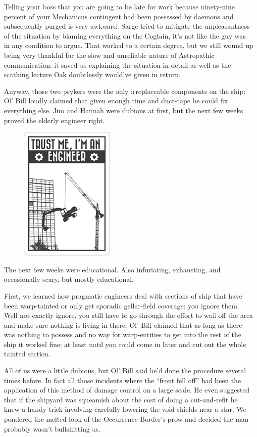 Telling your boss that you are going to be late for work because ninety-nine percent of your Mechanicus contingent had been possessed by daemons and subsequently purged is very awkward. 
Sarge tried to mitigate the unpleasantness of the situation by blaming everything on the Cogtain, it’s not like the guy was in any condition to argue. 
That worked to a certain degree, but we still wound up being very thankful for the slow and unreliable nature of Astropathic communication: 
it saved us explaining the situation in detail as well as the scathing lecture Oak doubtlessly would’ve given in return.

Anyway, those two psykers were the only irreplaceable components on the ship: 
Ol’ Bill loudly claimed that given enough time and duct-tape he could fix everything else. 
Jim and Hannah were dubious at first, but the next few weeks proved the elderly engineer right.

\begin{figure}
	\begin{center}
		\includegraphics[width=\figwidth]{pics/7/51.png}
	\end{center}
\end{figure}
The next few weeks were educational. 
Also infuriating, exhausting, and occasionally scary, but mostly educational.

First, we learned how pragmatic engineers deal with sections of ship that have been warp-tainted or only get sporadic gellar-field coverage: 
you ignore them. 
Well not exactly ignore, you still have to go through the effort to wall off the area and make sure nothing is living in there. 
Ol’ Bill claimed that as long as there was nothing to possess and no way for warp-entities to get into the rest of the ship it worked fine; 
at least until you could come in later and cut out the whole tainted section. 


All of us were a little dubious, but Ol’ Bill said he’d done the procedure several times before. 
In fact all those incidents where the “front fell off” had been the application of this method of damage control on a large scale. 
He even suggested that if the shipyard was squeamish about the cost of doing a cut-and-refit he knew a handy trick involving carefully lowering the void shields near a star. 
We pondered the melted look of the Occurrence Border’s prow and decided the man probably wasn’t bullshitting us.

